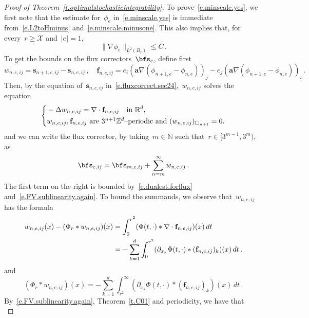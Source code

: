 \documentclass[11pt,twoside]{article} %
\let\oldsquare\square %
\renewcommand{\square}{\oldsquare}
\numberwithin{equation}{section}
\theoremstyle{definition}
\let\originalleft\left
\let\originalright\right
\renewcommand{\left}{\mathopen{}\mathclose\bgroup\originalleft}
\renewcommand{\right}{\aftergroup\egroup\originalright}
\newcommand*{\N}{\ensuremath{\mathbb{N}}}
\newcommand*{\Z}{\ensuremath{\mathbb{Z}}}
\newcommand*{\R}{\ensuremath{\mathbb{R}}}
\newcommand{\f}{\mathbf{f}}
\newcommand{\s}{\mathbf{s}}
\renewcommand{\a}{\mathbf{a}}
\newcommand{\cu}{\square}
\newcommand{\X}{\mathcal{X}}
\begin{document}
\begin{proof}[Proof of Theorem~\ref{t.optimalstochasticintegrability}]
To prove~\eqref{e.minscale.yes}, we first note that the estimate for~$\phi_e$ in~\eqref{e.minscale.yes} is immediate from~\eqref{e.L2toHminus} and~\eqref{e.minscale.minusone}. 
This also implies that, for every~$r \geq \X$ and~$|e|=1$,
\begin{equation}
\label{e.corrbounds}
\| \nabla \phi_e \|_{\underline{L}^2(B_r)}
\leq C\,.
\end{equation}
To get the bounds on the flux correctors~$\bfs_e$, define first 
\begin{equation*}  
w_{n,e,ij} = \s_{n+1,e,ij} - \s_{n,e,ij} 
\,, \quad 
\f_{n,e,ij} = e_i (\a\nabla( \phi_{n+1,e} {-} \phi_{n,e}) )_j  - e_j (\a\nabla( \phi_{n+1,e} {-} \phi_{n,e}) )_i \,.
\end{equation*}
Then, by the equation of~$\s_{n,e,ij}$ in~\eqref{e.fluxcorrect.sec24},~$w_{n,e,ij}$ solves the equation 
\begin{equation*}
\left\{
\begin{aligned}
&
-\Delta w_{n,e,ij} = \nabla \cdot \f_{n,e,ij}
\quad \mbox{in}  \ \R^d, \\
& w_{n,e,ij} , \f_{n,e,ij}  \ \mbox{are~$3^{n+1}\Z^d$--periodic and} \ ( w_{n,e,ij} )_{\cu_{n+1}} = 0.
\end{aligned}
\right. 
\end{equation*}
and we can  write the flux corrector, by taking~$m\in \N$ such that~$r \in [3^{m-1},3^m)$, as
\begin{equation*}  
\bfs_{e,ij} = \bfs_{m,e,ij} +  \sum_{n=m}^\infty w_{n,e,ij} \,.
\end{equation*}
The first term on the right is bounded by~\eqref{e.dualest.forflux} and~\eqref{e.FV.sublinearity.again}. To bound the summands, we observe that~$w_{n,e,ij}$ has the formula
\begin{align}
\label{e.w.present1}
w_{n,e,ij}(x) - (\Phi_r \ast w_{n,e,ij})(x) 
& 
=
\int_0^{r^2} ( \Phi(t,\cdot) \ast \nabla \cdot \f_{n,e,ij} )(x) \, dt
\notag \\
& 
=
- \sum_{k=1}^d \int_0^{r^2}  (\partial_{x_k} \Phi(t,\cdot) \ast  (\f_{n,e,ij})_k )(x) \, dt 
\,.
\end{align}
and 
\begin{equation}  \label{e.w.present2}
(\Phi_r \ast w_{n,e,ij})(x)  = - \sum_{k=1}^d \int_{r^2}^\infty  (\partial_{x_k} \Phi(t,\cdot) \ast  (\f_{n,e,ij})_k )(x) \, dt  \,.
\end{equation}
By~\eqref{e.FV.sublinearity.again}, Theorem~\ref{t.C01} and periodicity, we have that
\begin{equation}  \label{e.w.fbound}

\end{equation}
\end{proof}
\end{document}
